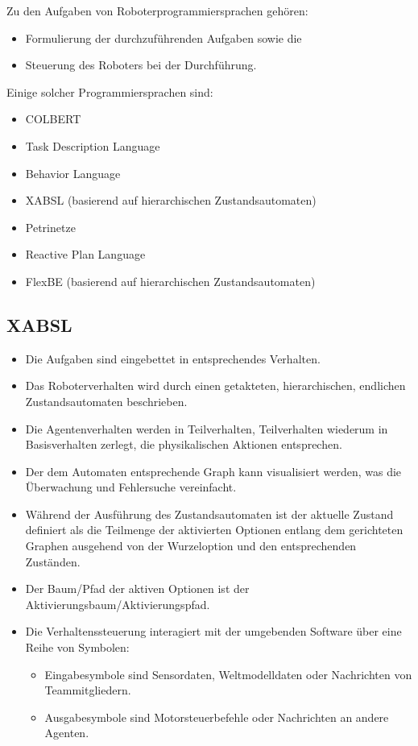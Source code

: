 		Zu den Aufgaben von Roboterprogrammiersprachen gehören:
		\begin{itemize}
			\item Formulierung der durchzuführenden Aufgaben sowie die
			\item Steuerung des Roboters bei der Durchführung.
		\end{itemize}
	
		Einige solcher Programmiersprachen sind:
		\begin{itemize}
			\item COLBERT
			\item Task Description Language
			\item Behavior Language
			\item XABSL (basierend auf hierarchischen Zustandsautomaten)
			\item Petrinetze
			\item Reactive Plan Language
			\item FlexBE (basierend auf hierarchischen Zustandsautomaten)
		\end{itemize}

		\subsection{XABSL}
			\begin{itemize}
				\item Die Aufgaben sind eingebettet in entsprechendes Verhalten.
				\item Das Roboterverhalten wird durch einen getakteten, hierarchischen, endlichen Zustandsautomaten beschrieben.
				\item Die Agentenverhalten werden in Teilverhalten,  Teilverhalten wiederum in Basisverhalten zerlegt, die physikalischen Aktionen entsprechen.
				\item Der dem Automaten entsprechende Graph kann visualisiert werden, was die Überwachung und Fehlersuche vereinfacht.
				\item Während der Ausführung des Zustandsautomaten ist der aktuelle Zustand definiert als die Teilmenge der aktivierten Optionen entlang dem gerichteten Graphen ausgehend von der Wurzeloption und den entsprechenden Zuständen.
				\item Der Baum/Pfad der aktiven Optionen ist der Aktivierungsbaum/Aktivierungspfad.
				\item Die Verhaltenssteuerung interagiert mit der umgebenden Software über eine Reihe von Symbolen:
					\begin{itemize}
						\item Eingabesymbole sind \zB Sensordaten, Weltmodelldaten oder Nachrichten von Teammitgliedern.
						\item Ausgabesymbole sind \zB Motorsteuerbefehle oder Nachrichten an andere Agenten.
					\end{itemize}
			\end{itemize}

